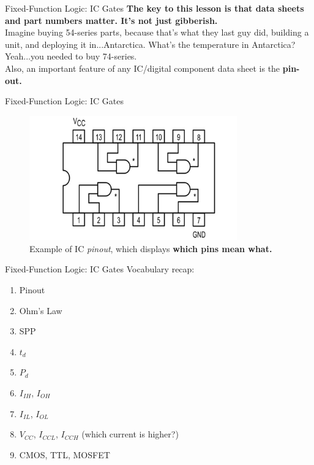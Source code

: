 \documentclass{beamer}
\begin{document}
\begin{frame}{Fixed-Function Logic: IC Gates}
\alert{\textbf{The key to this lesson is that data sheets and part numbers matter.  It's not just gibberish.}} \\ \vspace{1cm}
Imagine buying 54-series parts, because that's what they last guy did, building a unit, and deploying it in...Antarctica.  What's the temperature in Antarctica?  Yeah...you needed to buy 74-series. \\ \vspace{1cm}
Also, an important feature of any IC/digital component data sheet is the \textbf{pin-out.}
\end{frame}

\begin{frame}{Fixed-Function Logic: IC Gates}
\begin{figure}
\centering
\includegraphics[width=0.8\textwidth]{figures/Quad2NAND.png}
\caption{\label{fig:Q2N.png} Example of IC \textit{pinout}, which displays \textbf{which pins mean what.}}
\end{figure}
\end{frame}

\begin{frame}{Fixed-Function Logic: IC Gates}
Vocabulary recap:
\begin{enumerate}
\item Pinout
\item Ohm's Law
\item SPP
\item $t_d$
\item $P_d$
\item $I_{IH}$, $I_{OH}$
\item $I_{IL}$, $I_{OL}$
\item $V_{CC}$, $I_{CCL}$, $I_{CCH}$ (which current is higher?)
\item CMOS, TTL, MOSFET
\end{enumerate}
\end{frame}
\end{document}
